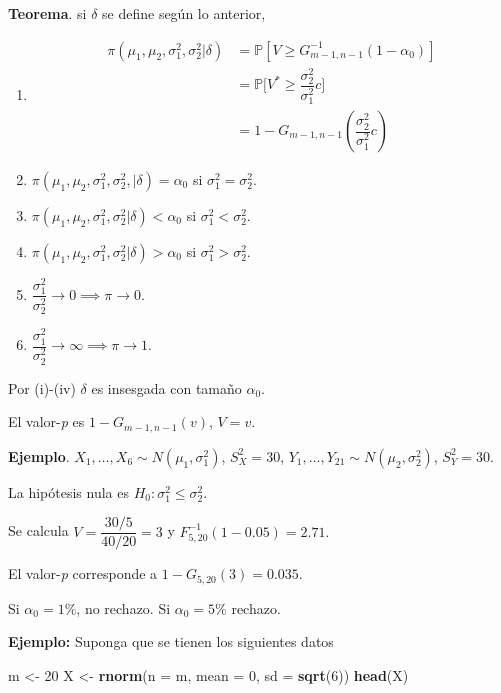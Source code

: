 \documentclass[
  12pt,
]{book}
\newenvironment{Shaded}{\begin{snugshade}}{\end{snugshade}}
\newcommand{\DataTypeTok}[1]{\textcolor[rgb]{0.13,0.29,0.53}{#1}}
\newcommand{\DecValTok}[1]{\textcolor[rgb]{0.00,0.00,0.81}{#1}}
\newcommand{\KeywordTok}[1]{\textcolor[rgb]{0.13,0.29,0.53}{\textbf{#1}}}
\newcommand{\NormalTok}[1]{#1}
\newcommand{\StringTok}[1]{\textcolor[rgb]{0.31,0.60,0.02}{#1}}
\begin{document}
\textbf{Teorema}. si \(\delta\) se define según lo anterior,

\begin{enumerate}
\def\labelenumi{\roman{enumi}.}
\item
  \begin{align*}
  \pi(\mu_1,\mu_2,\sigma_1^2,\sigma_2^2|\delta) & = \mathbb P[V\geq G^{-1}_{m-1,n-1}(1-\alpha_0)]\\
  & = \mathbb P\bigg[V^* \geq \dfrac{\sigma_2^2}{\sigma_1^2}c\bigg]\\
  & = 1-G_{m-1,n-1}\left(\dfrac{\sigma_2^2}{\sigma_1^2}c\right)
  \end{align*}
\item
  \(\pi(\mu_1,\mu_2,\sigma_1^2,\sigma_2^2,|\delta) = \alpha_0\) si \(\sigma_1^2 = \sigma_2^2\).
\item
  \(\pi(\mu_1,\mu_2,\sigma_1^2,\sigma_2^2|\delta) < \alpha_0\) si \(\sigma_1^2 < \sigma_2^2\).
\item
  \(\pi(\mu_1,\mu_2,\sigma_1^2,\sigma_2^2|\delta) > \alpha_0\) si \(\sigma_1^2 > \sigma_2^2\).
\item
  \(\dfrac{\sigma_1^2 }{\sigma_2^2 }\to 0 \implies \pi \to 0\).
\item
  \(\dfrac{\sigma_1^2 }{\sigma_2^2 }\to \infty \implies \pi \to 1\).
\end{enumerate}

Por (i)-(iv) \(\delta\) es insesgada con tamaño \(\alpha_0\).

El valor-\emph{p} es \(1-G_{m-1,n-1}(v)\), \(V=v\).

\textbf{Ejemplo}. \(X_1,\dots,X_{6}\sim N(\mu_1,\sigma_1^2)\), \(S_X ^2 =30\), \(Y_1,\dots,Y_{21}\sim N(\mu_2,\sigma_2^2)\), \(S_Y^2=30\).

La hipótesis nula es \(H_0: \sigma_1^2\leq \sigma_2^2\).

Se calcula \(V = \dfrac{30/5}{40/20} = 3\) y \(F^{-1}_{5,20}(1-0.05) = 2.71.\)

El valor-\emph{p} corresponde a \(1-G_{5,20}(3) = 0.035.\)

Si \(\alpha_0 = 1\%\), no rechazo. Si \(\alpha_0 = 5\%\) rechazo.

\textbf{Ejemplo:} Suponga que se tienen los siguientes datos

\begin{Shaded}
\begin{Highlighting}[]
\NormalTok{m \textless{}{-}}\StringTok{ }\DecValTok{20}
\NormalTok{X \textless{}{-}}\StringTok{ }\KeywordTok{rnorm}\NormalTok{(}\DataTypeTok{n =}\NormalTok{ m, }\DataTypeTok{mean =} \DecValTok{0}\NormalTok{, }\DataTypeTok{sd =} \KeywordTok{sqrt}\NormalTok{(}\DecValTok{6}\NormalTok{))}
\KeywordTok{head}\NormalTok{(X)}
\end{Highlighting}
\end{Shaded}
\end{document}
